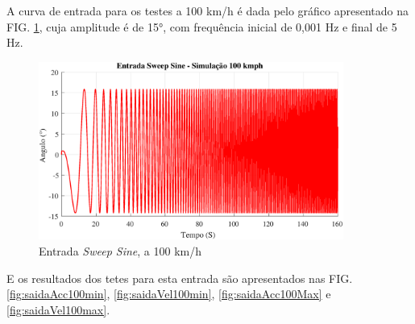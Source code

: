 \documentclass[a4paper, 12pt]{article}
\begin{document}
A curva de entrada para os testes a 100 km/h é dada pelo gráfico apresentado na FIG. \ref{fig:sweep_sine100}, cuja amplitude é de 15\si{\degree}, com frequência inicial de 0,001 Hz e final de 5 Hz.


\begin{figure}[H]
\centering
\includegraphics[width=10cm]{imagens/sweep100.eps}
\caption{Entrada \textit{Sweep Sine}, a 100 km/h}
\label{fig:sweep_sine100}
\end{figure}

E os resultados dos tetes para esta entrada são apresentados nas FIG. \ref{fig:saidaAcc100min}, \ref{fig:saidaVel100min}, \ref{fig:saidaAcc100Max} e \ref{fig:saidaVel100max}.
\end{document}
